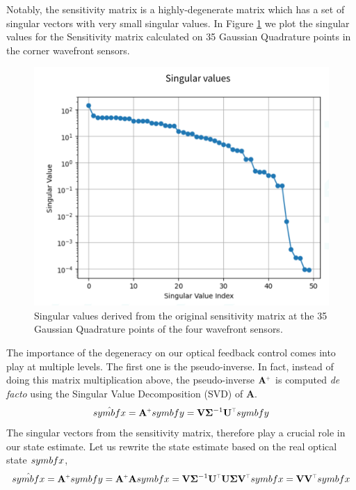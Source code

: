 \documentclass[SE,authoryear,toc]{lsstdoc}
\renewcommand{\v}[1]{\mathbf{#1}}
\newcommand{\plus}{\scalebox{0.6}{$+$}}
\newcommand{\tr}{\scalebox{0.6}{$\top$}}
\begin{document}
Notably, the sensitivity matrix is a highly-degenerate matrix which has a set of singular vectors with very small singular values. In Figure \ref{fig1} we plot the singular values for the Sensitivity matrix calculated on 35 Gaussian Quadrature points in the corner wavefront sensors. 

\begin{figure}[h!]
    \centering
    \includegraphics[scale = 0.5]{figures/singular_values.png}
    \caption{Singular values derived from the original sensitivity matrix at the 35 Gaussian Quadrature points of the four wavefront sensors.}
    \label{fig1}
\end{figure}

The importance of the degeneracy on our optical feedback control comes into play at multiple levels. The first one is the pseudo-inverse. In fact, instead of doing this matrix multiplication above, the pseudo-inverse $\v{A}^{\plus}$ is computed \textit{de facto} using the Singular Value Decomposition (SVD) of $\v{A}$.
\begin{equation}
     \hat{\\symbf{x}} = \v{A}^{\plus}\\symbf{y} = \v{V} \v{\Sigma}^{-1} \v{U^{\tr}}\\symbf{y}
\end{equation}
The singular vectors from the sensitivity matrix, therefore play a crucial role in our state estimate. Let us rewrite the state estimate based on the real optical state $\\symbf{x}$,
\begin{equation}
     \hat{\\symbf{x}} = \v{A}^{\plus}\\symbf{y} = \v{A}^{\plus}\v{A}\\symbf{x} = \v{V}\v{\Sigma}^{-1} \v{U^{\tr}}\v{U} \v{\Sigma} \v{V^{\tr}}\\symbf{x} =  \v{V}\v{V^{\tr}}\\symbf{x}
\end{equation}
\end{document}
